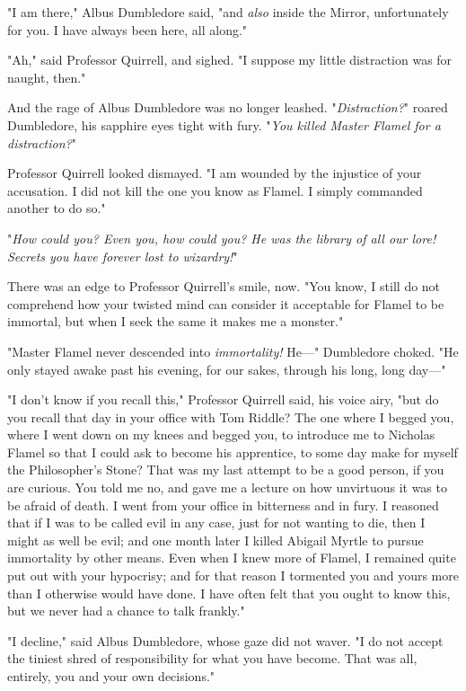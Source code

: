 "I am there," Albus Dumbledore said, "and \emph{also} inside the Mirror,
unfortunately for you. I have always been here, all along."

"Ah," said Professor Quirrell, and sighed. "I suppose my little distraction was
for naught, then."

And the rage of Albus Dumbledore was no longer leashed. "\emph{Distraction?}"
roared Dumbledore, his sapphire eyes tight with fury. "\emph{You killed Master
Flamel for a distraction?}"

Professor Quirrell looked dismayed. "I am wounded by the injustice of your
accusation. I did not kill the one you know as Flamel. I simply commanded
another to do so."

"\emph{How could you? Even you, how could you? He was the library of all our
lore! Secrets you have forever lost to wizardry!}"

There was an edge to Professor Quirrell’s smile, now. "You know, I still do not
comprehend how your twisted mind can consider it acceptable for Flamel to be
immortal, but when I seek the same it makes me a monster."

"Master Flamel never descended into \emph{immortality!} He—" Dumbledore
choked. "He only stayed awake past his evening, for our sakes, through his
long, long day—"

"I don’t know if you recall this," Professor Quirrell said, his voice airy,
"but do you recall that day in your office with Tom Riddle? The one where I
begged you, where I went down on my knees and begged you, to introduce me to
Nicholas Flamel so that I could ask to become his apprentice, to some day make
for myself the Philosopher’s Stone? That was my last attempt to be a good
person, if you are curious. You told me no, and gave me a lecture on how
unvirtuous it was to be afraid of death. I went from your office in bitterness
and in fury. I reasoned that if I was to be called evil in any case, just for
not wanting to die, then I might as well be evil; and one month later I killed
Abigail Myrtle to pursue immortality by other means. Even when I knew more of
Flamel, I remained quite put out with your hypocrisy; and for that reason I
tormented you and yours more than I otherwise would have done. I have often
felt that you ought to know this, but we never had a chance to talk frankly."

"I decline," said Albus Dumbledore, whose gaze did not waver. "I do not accept
the tiniest shred of responsibility for what you have become. That was all,
entirely, you and your own decisions."

